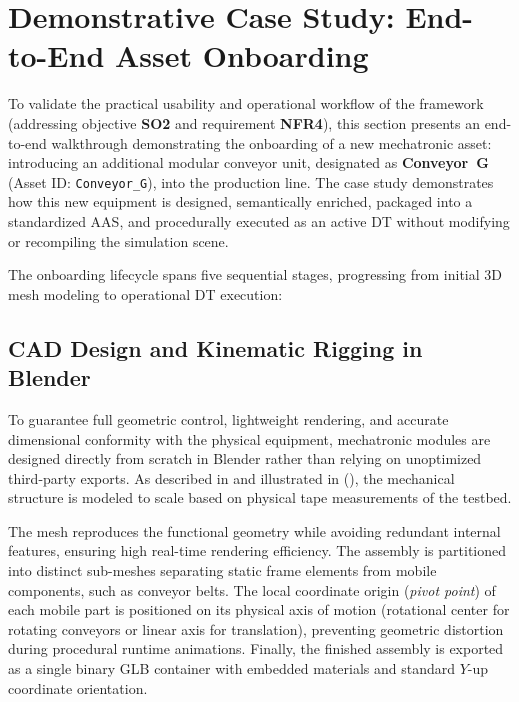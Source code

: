 \section{Demonstrative Case Study: End-to-End Asset Onboarding}
\label{sec:eval_case_study}

To validate the practical usability and operational workflow of the framework (addressing objective \textbf{SO2} and requirement \textbf{NFR4}), this section presents an end-to-end walkthrough demonstrating the onboarding of a new mechatronic asset: introducing an additional modular conveyor unit, designated as \textbf{Conveyor~G} (Asset ID: \texttt{Conveyor\_G}), into the production line. The case study demonstrates how this new equipment is designed, semantically enriched, packaged into a standardized \gls{AAS}, and procedurally executed as an active \gls{DT} without modifying or recompiling the simulation scene.

The onboarding lifecycle spans five sequential stages, progressing from initial 3D mesh modeling to operational \gls{DT} execution:

\subsection{\texorpdfstring{\gls{CAD}}{CAD} Design and Kinematic Rigging in Blender}
To guarantee full geometric control, lightweight rendering, and accurate dimensional conformity with the physical equipment, mechatronic modules are designed directly from scratch in Blender rather than relying on unoptimized third-party exports. As described in  and illustrated in  (), the mechanical structure is modeled to scale based on physical tape measurements of the testbed. 

The mesh reproduces the functional geometry while avoiding redundant internal features, ensuring high real-time rendering efficiency. The assembly is partitioned into distinct sub-meshes separating static frame elements from mobile components, such as conveyor belts. The local coordinate origin (\textit{pivot point}) of each mobile part is positioned on its physical axis of motion (rotational center for rotating conveyors or linear axis for translation), preventing geometric distortion during procedural runtime animations. Finally, the finished assembly is exported as a single binary \gls{GLB} container with embedded materials and standard $Y$-up coordinate orientation.


